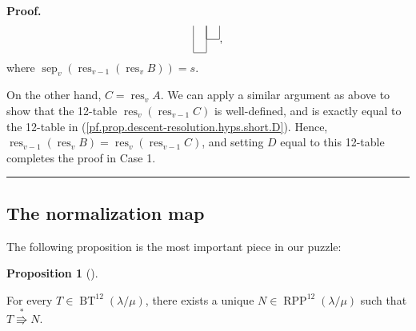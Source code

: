 \documentclass[numbers=enddot,12pt,final,onecolumn,notitlepage]{scrartcl}%
\theoremstyle{definition}
\newtheorem{prop}[theo]{Proposition}
\newenvironment{proposition}[1][]
{\begin{prop}[#1]\begin{leftbar}}
{\end{leftbar}\end{prop}}
\newenvironment{proof}[1][Proof]{\noindent\textbf{#1.} }{\ \rule{0.5em}{0.5em}}
\def\OneTwoRPP{{\operatorname{RPP}^{12}\left(  \lambda/\mu\right)}}
\def\BenignTables{{\operatorname{BT}^{12}\left(  \lambda/\mu\right)}}
\begin{document}
\begin{proof}
\begin{equation}
\begin{tabular}{ccc}
\cline{3-3} \multicolumn{1}{|c|}{} & \multicolumn{1}{|c|}{} \\
\cline{2-2} \multicolumn{1}{|c|}{} \\
\cline{1-1}
\end{tabular}%
, \label{pf.prop.descent-resolution.hyps.short.D}%
\end{equation}
where $\operatorname*{sep}\nolimits_{v} \left( \operatorname*{res}\nolimits_{v-1}\left(  \operatorname*{res}\nolimits_{v}%
B\right) \right) = s$.

On the other hand, $C = \operatorname*{res}\nolimits_{v}A$. We can apply a similar argument as above to show that the 12-table $\operatorname*{res}\nolimits_{v}\left(
\operatorname*{res}\nolimits_{v-1}C\right)  $ is well-defined, and is exactly equal to the 12-table in (\ref{pf.prop.descent-resolution.hyps.short.D}).
Hence, $\operatorname*{res}%
\nolimits_{v-1}\left(  \operatorname*{res}\nolimits_{v}B\right) = \operatorname*{res}\nolimits_{v}\left(
\operatorname*{res}\nolimits_{v-1}C\right)$, and setting $D$ equal to this 12-table completes the proof in Case 1.
\end{proof}

\subsection{The normalization map}

The following proposition is the most important piece in our puzzle:

\begin{proposition}
\label{prop.BK.norm}For every $T\in\BenignTables$, there exists a unique
$N\in\OneTwoRPP$ such that $T\overset{\ast}{\Rrightarrow}N$.
\end{proposition}
\end{document}
